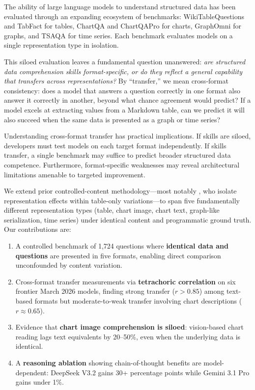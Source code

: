 \documentclass[11pt]{article}
\begin{document}
The ability of large language models to understand structured data has been evaluated through an expanding ecosystem of benchmarks: WikiTableQuestions \cite{pasupat2015compositional} and TabFact \cite{chen2020tabfact} for tables, ChartQA \cite{masry2022chartqa} and ChartQAPro \cite{chartqapro2025} for charts, GraphOmni \cite{graphomni2026} for graphs, and TSAQA \cite{tsaqa2026} for time series. Each benchmark evaluates models on a single representation type in isolation.

This siloed evaluation leaves a fundamental question unanswered: \emph{are structured data comprehension skills format-specific, or do they reflect a general capability that transfers across representations?} By ``transfer,'' we mean cross-format consistency: does a model that answers a question correctly in one format also answer it correctly in another, beyond what chance agreement would predict? If a model excels at extracting values from a Markdown table, can we predict it will also succeed when the same data is presented as a graph or time series?

Understanding cross-format transfer has practical implications. If skills are siloed, developers must test models on each target format independently. If skills transfer, a single benchmark may suffice to predict broader structured data competence. Furthermore, format-specific weaknesses may reveal architectural limitations amenable to targeted improvement.

We extend prior controlled-content methodology---most notably \citet{zhang2026samecontent}, who isolate representation effects within table-only variations---to span five fundamentally different representation types (table, chart image, chart text, graph-like serialization, time series) under identical content and programmatic ground truth. Our contributions are:

\begin{enumerate}
    \item A controlled benchmark of 1,724 questions where \textbf{identical data and questions} are presented in five formats, enabling direct comparison unconfounded by content variation.
    \item Cross-format transfer measurements via \textbf{tetrachoric correlation} on six frontier March 2026 models, finding strong transfer ($r{>}0.85$) among text-based formats but moderate-to-weak transfer involving chart descriptions ($r{\approx}0.65$).
    \item Evidence that \textbf{chart image comprehension is siloed}: vision-based chart reading lags text equivalents by 20--50\%, even when the underlying data is identical.
    \item A \textbf{reasoning ablation} showing chain-of-thought benefits are model-dependent: DeepSeek V3.2 gains 30+ percentage points while Gemini 3.1 Pro gains under 1\%.
\end{enumerate}
\end{document}
